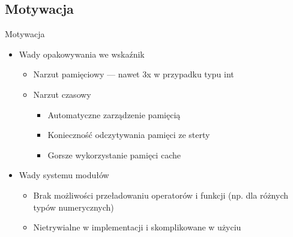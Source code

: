 \documentclass{beamer}
\begin{document}
\subsection{Motywacja}

\begin{frame}{Motywacja}
\begin{itemize}
    \item Wady opakowywania we wskaźnik
    \begin{itemize}
        \pause
        \item Narzut pamięciowy --- nawet 3x w przypadku typu int
        \pause
        \item Narzut czasowy 
        \begin{itemize}
            \item Automatyczne zarządzenie pamięcią
            \item Konieczność odczytywania pamięci ze sterty 
            \item Gorsze wykorzystanie pamięci cache
        \end{itemize}
    \end{itemize}

    \pause
    \item Wady systemu modułów
    \begin{itemize}
        \pause
        \item Brak możliwości przeładowaniu operatorów i funkcji (np. dla różnych 
        typów numerycznych)
        \pause
        \item Nietrywialne w implementacji i skomplikowane w użyciu
    \end{itemize}

\end{itemize}
\end{frame}
\end{document}
